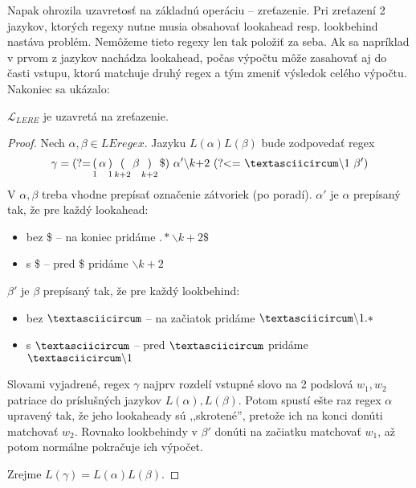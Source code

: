 \documentclass{svk_long_sk}
\def\le{LEregex}
\def\lel{\mathscr{L}_{LERE}}
\def\lookahead{\text{(?=}}
\def\lookbehind{\text{(?\textless =}}
\begin{document}
Napak ohrozila uzavretosť na základnú operáciu -- zreťazenie. Pri zreťazení 2 jazykov, ktorých regexy nutne musia obsahovať lookahead resp. lookbehind nastáva problém. Nemôžeme tieto regexy len tak položiť za seba. Ak sa napríklad v prvom z jazykov nachádza lookahead, počas výpočtu môže zasahovať aj do časti vstupu, ktorú matchuje druhý regex a tým zmeniť výsledok celého výpočtu. Nakoniec sa ukázalo:
\begin{theorem}
$\lel$ je uzavretá na zreťazenie.
\end{theorem}
\begin{proof}
Nech $\alpha,\beta\in\le$. Jazyku $L(\alpha)L(\beta)$ bude zodpovedať regex
$$
\gamma = \lookahead \mathop(_1 \alpha \mathop)_1 \mathop(_{k+2}\beta \mathop)_{k+2} \mathdollar) ~\alpha ' \backslash k\text{+2}~ \lookbehind ~\textasciicircum\backslash 1~\beta ')
$$
V $\alpha,\beta$ treba vhodne prepísať označenie zátvoriek (po poradí). $\alpha '$ je $\alpha$ prepísaný tak, že pre každý lookahead:
\begin{itemize}
\item bez \$ -- na koniec pridáme $.* \backslash k+2 \mathdollar $
\item s \$ -- pred \$ pridáme $\backslash k+2$
\end{itemize}
$\beta '$ je $\beta$ prepísaný tak, že pre každý lookbehind:
\begin{itemize}
\item bez $\textasciicircum$ -- na začiatok pridáme $\textasciicircum \backslash 1.*$
\item s $\textasciicircum$ -- pred $\textasciicircum$ pridáme $\textasciicircum \backslash 1$
\end{itemize}

Slovami vyjadrené, regex $\gamma$ najprv rozdelí vstupné slovo na 2 podslová $w_1,w_2$ patriace do príslušných jazykov $L(\alpha), L(\beta)$. Potom spustí ešte raz regex $\alpha$ upravený tak, že jeho lookaheady sú ,,skrotené'', pretože ich na konci donúti matchovať $w_2$. Rovnako lookbehindy v $\beta'$ donúti na začiatku matchovať $w_1$, až potom normálne pokračuje ich výpočet.

Zrejme $L(\gamma)=L(\alpha)L(\beta)$.
\end{proof}
\end{document}
